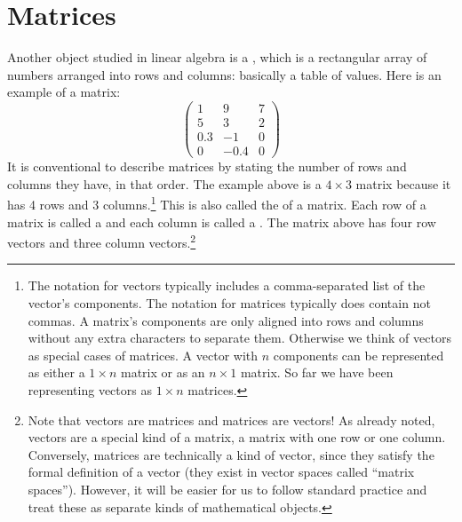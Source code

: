 \section{Matrices}\label{sect_matrices}


   Another object studied in linear algebra is a , which is a 
rectangular array of numbers arranged into rows and columns: basically a table of 
values. Here is an example of a matrix:
\[
\begin{pmatrix}
 1  &   9  & 7 \\
 5  &   3  & 2 \\
0.3 &  -1  & 0 \\
 0  & -0.4 & 0
\end{pmatrix}
\]
It is conventional to describe matrices by stating the number of rows and 
columns they have, in that order. The example above is a $4 \times 3$ 
matrix because it has 4 rows and 3 columns.\footnote{The notation for vectors typically includes a comma-separated list of the vector's components. The notation for matrices typically does contain not commas. A  matrix's components are only aligned into rows and columns without any extra characters to separate them. Otherwise we think of vectors as special cases of matrices. A vector with $n$ components can be represented as either a $1 \times n$ matrix or as an $n \times 1$ matrix. So far we have been representing vectors as $1 \times n$ matrices.} This is also called the  of a matrix.  Each row of a matrix is called a  and each column is called a . The matrix above has four row vectors and 
three column vectors.\footnote{Note that vectors  are matrices and matrices are vectors!  As already noted, vectors are a special kind of a matrix, 
a matrix with one row or one column. Conversely, matrices are technically a 
kind of vector, since they satisfy the formal definition of a vector (they 
exist in vector spaces called ``matrix spaces''). However, it will be easier for us to follow standard practice and treat these as separate kinds of mathematical objects.}  

